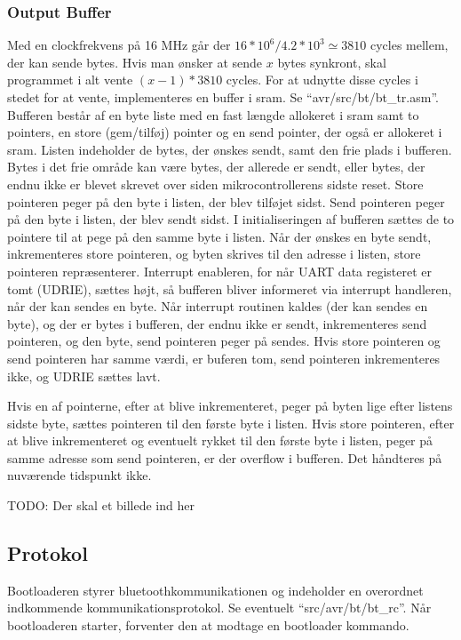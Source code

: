 \subsubsection{Output Buffer}
Med en clockfrekvens på 16 MHz går der $16*10^6 / 4.2*10^3 \simeq 3810$ cycles mellem, der kan sende bytes. Hvis man ønsker at sende $x$ bytes synkront, skal programmet i alt vente $(x-1)*3810$ cycles. For at udnytte disse cycles i stedet for at vente, implementeres en buffer i sram.
Se ``avr/src/bt/bt\_tr.asm''.
Bufferen består af en byte liste med en fast længde allokeret i sram samt to pointers, en store (gem/tilføj) pointer og en send pointer, der også er allokeret i sram. Listen indeholder de bytes, der ønskes sendt, samt den frie plads i bufferen. Bytes i det frie område kan være bytes, der allerede er sendt, eller bytes, der endnu ikke er blevet skrevet over siden mikrocontrollerens sidste reset. Store pointeren peger på den byte i listen, der blev tilføjet sidst. Send pointeren peger på den byte i listen, der blev sendt sidst.
I initialiseringen af bufferen sættes de to pointere til at pege på den samme byte i listen.
Når der ønskes en byte sendt, inkrementeres store pointeren, og byten skrives til den adresse i listen, store pointeren repræsenterer. Interrupt enableren, for når UART data registeret er tomt (UDRIE), sættes højt, så bufferen bliver informeret via interrupt handleren, når der kan sendes en byte.
Når interrupt routinen kaldes (der kan sendes en byte), og der er bytes i bufferen, der endnu ikke er sendt, inkrementeres send pointeren, og den byte, send pointeren peger på sendes. Hvis store pointeren og send pointeren har samme værdi, er buferen tom, send pointeren inkrementeres ikke, og UDRIE sættes lavt.

Hvis en af pointerne, efter at blive inkrementeret, peger på byten lige efter listens sidste byte, sættes pointeren til den første byte i listen.
Hvis store pointeren, efter at blive inkrementeret og eventuelt rykket til den første byte i listen, peger på samme adresse som send pointeren, er der overflow i bufferen. Det håndteres på nuværende tidspunkt ikke.

TODO: Der skal et billede ind her

\subsection{Protokol}
Bootloaderen styrer bluetoothkommunikationen og indeholder en overordnet indkommende kommunikationsprotokol.
Se eventuelt ``src/avr/bt/bt\_rc''.
Når bootloaderen starter, forventer den at modtage en bootloader kommando.

